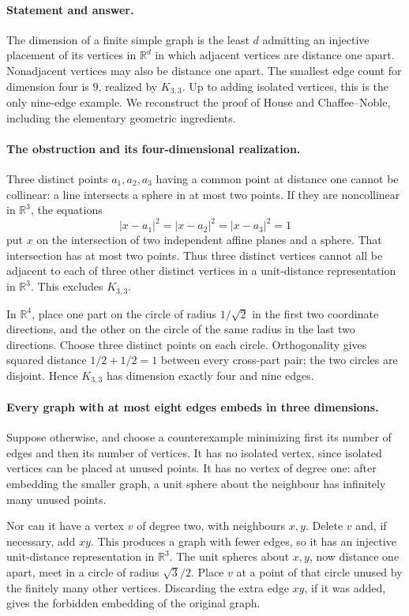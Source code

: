 \paragraph{Statement and answer.}
The dimension of a finite simple graph is the least \(d\) admitting an injective placement of its vertices in \(\mathbb R^d\) in which adjacent vertices are distance one apart. Nonadjacent vertices may also be distance one apart. The smallest edge count for dimension four is \(\boxed{9}\), realized by \(K_{3,3}\). Up to adding isolated vertices, this is the only nine-edge example. We reconstruct the proof of House and Chaffee--Noble, including the elementary geometric ingredients.

\paragraph{The obstruction and its four-dimensional realization.}
Three distinct points \(a_1,a_2,a_3\) having a common point at distance one cannot be collinear: a line intersects a sphere in at most two points. If they are noncollinear in \(\mathbb R^3\), the equations
\[
 |x-a_1|^2=|x-a_2|^2=|x-a_3|^2=1
\]
put \(x\) on the intersection of two independent affine planes and a sphere. That intersection has at most two points. Thus three distinct vertices cannot all be adjacent to each of three other distinct vertices in a unit-distance representation in \(\mathbb R^3\). This excludes \(K_{3,3}\).

In \(\mathbb R^4\), place one part on the circle of radius \(1/\sqrt2\) in the first two coordinate directions, and the other on the circle of the same radius in the last two directions. Choose three distinct points on each circle. Orthogonality gives squared distance \(1/2+1/2=1\) between every cross-part pair; the two circles are disjoint. Hence \(K_{3,3}\) has dimension exactly four and nine edges.

\paragraph{Every graph with at most eight edges embeds in three dimensions.}
Suppose otherwise, and choose a counterexample minimizing first its number of edges and then its number of vertices. It has no isolated vertex, since isolated vertices can be placed at unused points. It has no vertex of degree one: after embedding the smaller graph, a unit sphere about the neighbour has infinitely many unused points.

Nor can it have a vertex \(v\) of degree two, with neighbours \(x,y\). Delete \(v\) and, if necessary, add \(xy\). This produces a graph with fewer edges, so it has an injective unit-distance representation in \(\mathbb R^3\). The unit spheres about \(x,y\), now distance one apart, meet in a circle of radius \(\sqrt3/2\). Place \(v\) at a point of that circle unused by the finitely many other vertices. Discarding the extra edge \(xy\), if it was added, gives the forbidden embedding of the original graph.

